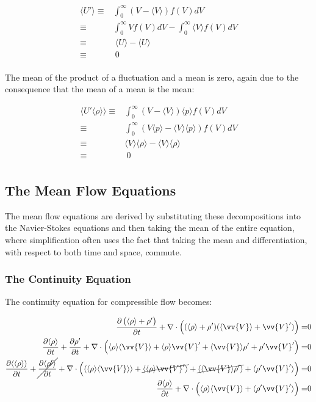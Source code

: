 \documentclass[10pt]{article}
\newcommand{\beqa}{\begin{equation}\begin{aligned}}
\newcommand{\eeqa}{\end{aligned}\end{equation}}
\newcommand{\la}{\langle}
\newcommand{\ra}{\rangle}
\begin{document}
\begin{flushleft}
\begin{tcolorbox}[breakable]
\beqa
\la U'\ra\equiv&\int_{0}^{\infty}(V-\la V\ra)f(V)dV\\
\equiv& \int_{0}^{\infty}Vf(V)dV - \int_{0}^{\infty}\la V\ra f(V)dV\\
\equiv&\ \la U\ra - \la U\ra\\
\equiv&\ 0\\
\eeqa

The mean of the product of a fluctuation and a mean is zero, again due to the consequence that the mean of a mean is the mean:

\beqa
\la U'\la\rho\ra\ra\equiv&\int_{0}^{\infty}(V-\la V\ra)\la p\ra f(V)dV\\
\equiv&\int_{0}^{\infty}\left(V\la p\ra-\la V\ra\la p\ra\right)f(V)dV\\
\equiv&\la V\ra\la\rho\ra-\la V\ra\la\rho\ra\\
\equiv&\ 0\\
\eeqa

\end{tcolorbox}




\subsection{The Mean Flow Equations}

The mean flow equations are derived by substituting these decompositions into the Navier-Stokes equations and then taking the mean of the entire equation, where simplification often uses the fact that taking the mean and differentiation, with respect to both time and space, commute. 


\subsubsection{The Continuity Equation}
The continuity equation for compressible flow becomes:

\beqa
\frac{\partial \left(\la\rho\ra+\rho'\right)}{\partial t}+\nabla\cdot \left((\la\rho\ra+\rho')(\la\vv{V}\ra+\vv{V}')\right)=&0\\
\frac{\partial\la\rho\ra}{\partial t}+\frac{\partial\rho'}{\partial t}+\nabla\cdot \left(\la\rho\ra\la\vv{V}\ra+\la\rho\ra\vv{V}'+\la\vv{V}\ra\rho'+\rho'\vv{V}'\right)=&0\\
\frac{\partial\la\la\rho\ra\ra}{\partial t}+\cancel{\frac{\partial\la\rho'\ra}{\partial t}}+\nabla\cdot\left(\la\la\rho\ra\la\vv{V}\ra\ra+\cancel{\la\la\rho\ra\vv{V}'\ra}+\cancel{\la\la\vv{V}\ra\rho'\ra}+\la\rho'\vv{V}'\ra\right)=&0\\
\frac{\partial\la\rho\ra}{\partial t}+\nabla\cdot\left(\la\rho\ra\la\vv{V}\ra+\la\rho'\vv{V}'\ra\right)=&0\\
\eeqa


\end{flushleft}
\end{document}
